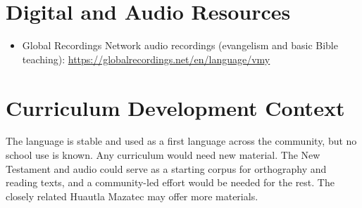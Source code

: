\documentclass[12pt]{article}
\begin{document}
\section{Digital and Audio Resources}
\begin{itemize}
\item Global Recordings Network audio recordings (evangelism and basic Bible teaching): \url{https://globalrecordings.net/en/language/vmy}
\end{itemize}

\section{Curriculum Development Context}
The language is stable and used as a first language across the community, but no school use is known. Any curriculum would need new material. The New Testament and audio could serve as a starting corpus for orthography and reading texts, and a community-led effort would be needed for the rest. The closely related Huautla Mazatec may offer more materials.
\end{document}
